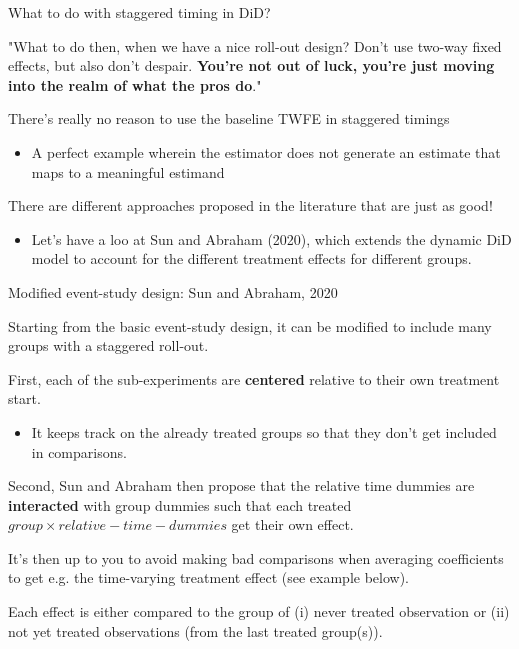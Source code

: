 \documentclass[notes,11pt, aspectratio=169]{beamer}
\newenvironment{wideitemize}{\itemize\addtolength{\itemsep}{10pt}}{\enditemize}
\begin{document}
\begin{frame}{What to do with staggered timing in DiD?}

  \begin{center}
      "What to do then, when we have a nice roll-out design? Don't use two-way fixed effects, but also don't despair. \textbf{You're not out of luck, you're just moving into the realm of what the pros do}." \color{gray}{(The effect)}
  \end{center}
  
  \begin{wideitemize}
  \item There's really no reason to use the baseline TWFE in staggered timings
    \begin{itemize}
    \item A perfect example wherein the estimator does not generate an
      estimate that maps to a meaningful estimand
    \end{itemize}
  \item There are different approaches proposed in the literature  that are just as good! 
    \begin{itemize}
    \item Let's have a loo at Sun and Abraham (2020), which extends the dynamic DiD model to account for the different treatment effects for different groups.     
    \end{itemize}
  \end{wideitemize}
\end{frame}

\begin{frame}{Modified event-study design: Sun and Abraham, 2020}
\begin{wideitemize}
    \item Starting from the basic event-study design, it can be modified to include many groups with a staggered roll-out.
    \item First, each of the sub-experiments are \textbf{centered} relative to their own treatment start.
    
    \begin{itemize}
        \item It keeps track on the already treated groups so that they don't get included in comparisons.
    \end{itemize}
    
    \item Second, Sun and Abraham then propose that the relative time dummies are \textbf{interacted} with group dummies such that each treated $group\times relative-time-dummies$ get their own effect. 
    
    \item It's then up to you to avoid making bad comparisons when averaging coefficients to get e.g. the time-varying treatment effect (see example below).

    \item Each effect is either compared to the group of (i) never treated observation or (ii) not yet treated observations (from the last treated group(s)).
\end{wideitemize}
\end{frame}
\end{document}
